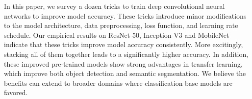 \documentclass[10pt,twocolumn,letterpaper]{article}
\begin{document}
In this paper, we survey a dozen tricks to train deep convolutional neural
networks to improve model accuracy. These tricks introduce minor modifications to the model
architecture, data preprocessing, loss function, and
learning rate schedule. Our empirical results on ResNet-50, Inception-V3 and
MobileNet indicate that these tricks improve model accuracy consistently. More excitingly, stacking
all of them together leads to a significantly higher accuracy. In addition,
these improved pre-trained models show strong advantages in transfer learning, which improve both
object detection and semantic segmentation. We believe the benefits can extend to broader domains where classification base models are favored.

{\small


}
\end{document}
